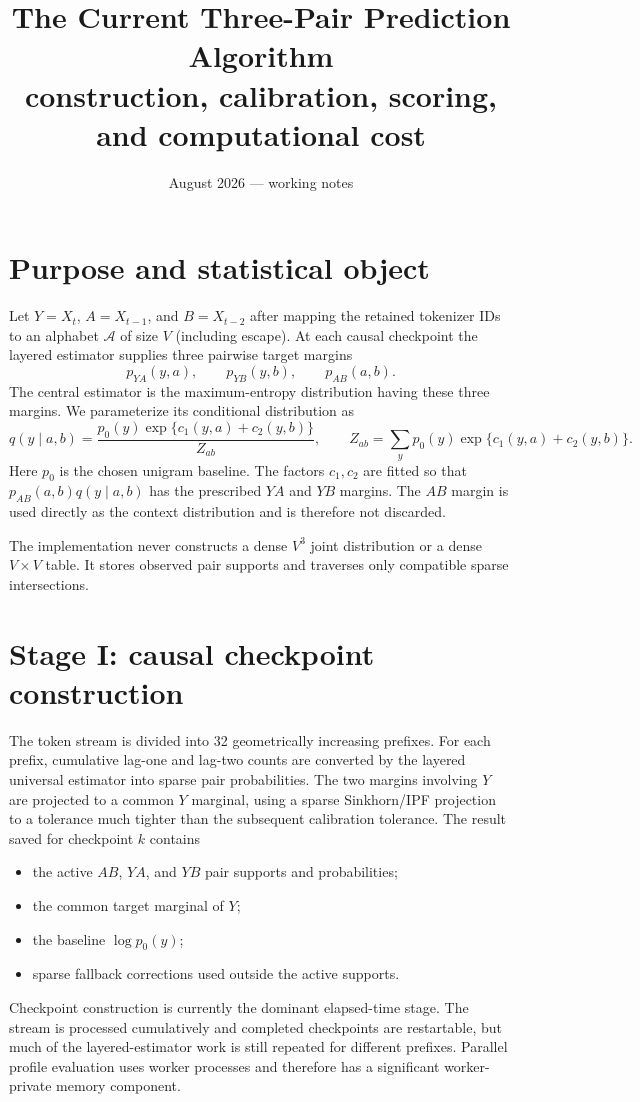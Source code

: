 \documentclass[11pt]{article}
\title{The Current Three-Pair Prediction Algorithm\\
\large construction, calibration, scoring, and computational cost}
\author{}
\date{August 2026 --- working notes}
\newcommand{\cA}{\mathcal A}
\begin{document}
\maketitle

\section{Purpose and statistical object}

Let $Y=X_t$, $A=X_{t-1}$, and $B=X_{t-2}$ after mapping the retained
tokenizer IDs to an alphabet $\cA$ of size $V$ (including escape).  At each
causal checkpoint the layered estimator supplies three pairwise target
margins
\[
 p_{YA}(y,a),\qquad p_{YB}(y,b),\qquad p_{AB}(a,b).
\]
The central estimator is the maximum-entropy distribution having these three
margins.  We parameterize its conditional distribution as
\begin{equation}
 q(y\mid a,b)
 =\frac{p_0(y)\exp\{c_1(y,a)+c_2(y,b)\}}{Z_{ab}},
 \qquad
 Z_{ab}=\sum_y p_0(y)\exp\{c_1(y,a)+c_2(y,b)\}.
 \label{eq:model}
\end{equation}
Here $p_0$ is the chosen unigram baseline.  The factors $c_1,c_2$ are fitted
so that $p_{AB}(a,b)q(y\mid a,b)$ has the prescribed $YA$ and $YB$
margins.  The $AB$ margin is used directly as the context distribution and
is therefore not discarded.

The implementation never constructs a dense $V^3$ joint distribution or a
dense $V\times V$ table.  It stores observed pair supports and traverses only
compatible sparse intersections.

\section{Stage I: causal checkpoint construction}

The token stream is divided into 32 geometrically increasing prefixes.  For
each prefix, cumulative lag-one and lag-two counts are converted by the
layered universal estimator into sparse pair probabilities.  The two
margins involving $Y$ are projected to a common $Y$ marginal, using a sparse
Sinkhorn/IPF projection to a tolerance much tighter than the subsequent
calibration tolerance.  The result saved for checkpoint $k$ contains
\begin{itemize}
\item the active $AB$, $YA$, and $YB$ pair supports and probabilities;
\item the common target marginal of $Y$;
\item the baseline $\log p_0(y)$;
\item sparse fallback corrections used outside the active supports.
\end{itemize}
Checkpoint construction is currently the dominant elapsed-time stage.  The
stream is processed cumulatively and completed checkpoints are restartable,
but much of the layered-estimator work is still repeated for different
prefixes.  Parallel profile evaluation uses worker processes and therefore
has a significant worker-private memory component.
\end{document}
